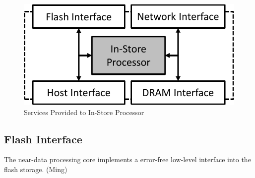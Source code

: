 \begin{figure}[h]
	\begin{center}
	\includegraphics[width=0.3\paperwidth]{figures/isp-service-crop.pdf}
	\caption{Services Provided to In-Store Processor}
	\label{fig:ispcore}
	\end{center}
\end{figure}

\subsection{Flash Interface}

The near-data processing core implements a error-free low-level interface into
the flash storage. (Ming)

